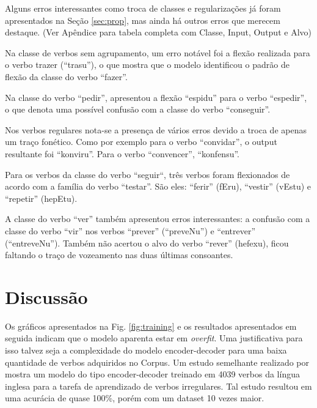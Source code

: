 Alguns erros interessantes como troca de classes e regularizações já foram apresentados na Seção \ref{sec:prop}, mas ainda há outros erros que merecem destaque. (Ver Apêndice para tabela completa com Classe, Input, Output e Alvo)

Na classe de verbos sem agrupamento, um erro notável foi a flexão realizada para o verbo trazer (“trasu”), o que mostra que o modelo identificou o padrão de flexão da classe do verbo “fazer”. 

Na classe do verbo “pedir”, apresentou a flexão “espidu” para o verbo “espedir”, o que denota uma possível confusão com a classe do verbo “conseguir”.

Nos verbos regulares nota-se a presença de vários erros devido a troca de apenas um traço fonético. Como por exemplo para o verbo “convidar”, o output resultante foi “konviru”. Para o verbo “convencer”, “konfensu”.

Para os verbos da classe do verbo “seguir“, três verbos foram flexionados de acordo com a família do verbo “testar”. São eles: “ferir” (fEru), “vestir” (vEstu) e “repetir” (hepEtu).

A classe do verbo “ver” também apresentou erros interessantes: a confusão com a classe do verbo “vir” nos verbos “prever” (“preveNu”) e “entrever” (“entreveNu”). Também não acertou o alvo do verbo “rever” (hefexu), ficou faltando o traço de vozeamento nas duas últimas consoantes.

\section{Discussão}


Os gráficos apresentados na Fig. \ref{fig:training} e os resultados apresentados em seguida indicam que o modelo aparenta estar em \textit{overfit}. Uma justificativa para isso talvez seja a complexidade do modelo encoder-decoder para uma baixa quantidade de verbos adquiridos no Corpus. Um estudo semelhante realizado por \cite{kirov:2018} mostra um modelo do tipo encoder-decoder treinado em 4039 verbos da língua inglesa para a tarefa de aprendizado de verbos irregulares. Tal estudo resultou em uma acurácia de quase 100\%, porém com um dataset 10 vezes maior.

